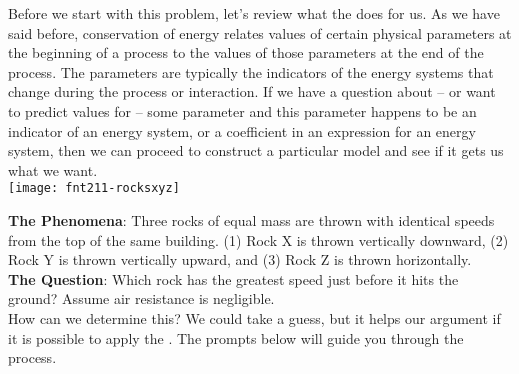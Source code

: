 Before we start with this problem, let's review what the \EnergyInteractionModel{} does for us. As we have said before, conservation of energy relates values of certain physical parameters at the beginning of a process to the values of those parameters at the end of the process. The parameters are typically the indicators of the energy systems that change during the process or interaction. If we have a question about -- or want to predict values for -- some parameter and this parameter happens to be an indicator of an energy system, or a coefficient in an expression for an energy system, then we can proceed to construct a particular model and see if it gets us what we want.\\

	\texttt{[image: fnt211-rocksxyz]}	

\label{fnt2.1.1-1}

\noindent\textbf{The Phenomena}: Three rocks of equal mass are thrown with identical speeds from the top of the same building. (1) Rock X is thrown vertically downward, (2) Rock Y is thrown vertically upward, and (3) Rock Z is thrown horizontally.\\

\noindent\textbf{The Question}: Which rock has the greatest speed just before it hits the ground? Assume air resistance is negligible.\\

\noindent How can we determine this? We could take a guess, but it helps our argument if it is possible to apply the \EnergyInteractionModel{}. The prompts below will guide you through the process.

